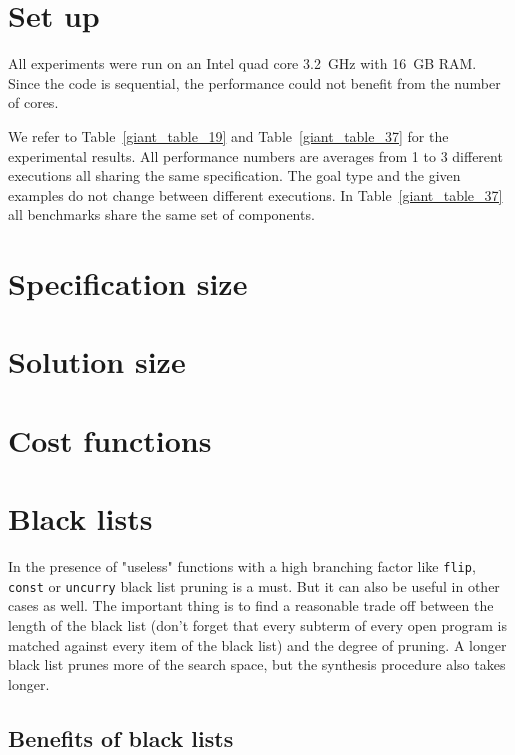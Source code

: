 \section{Set up}
All experiments were run on an Intel quad core 3.2~GHz with 16~GB RAM. Since the code is sequential, the performance could not benefit from the number of cores.

We refer to Table~\ref{giant_table_19} and Table~\ref{giant_table_37} for the experimental results. All performance numbers are averages from 1 to 3 different executions all sharing the same specification. The goal type and the given examples do not change between different executions. In Table~\ref{giant_table_37} all benchmarks share the same set of components.

\section{Specification size}

\section{Solution size}
  
\section{Cost functions}

\section{Black lists}

In the presence of "useless" functions with a high branching factor like \lstinline?flip?, \lstinline?const? or \lstinline?uncurry? black list pruning is a must. But it can also be useful in other cases as well. The important thing is to find a reasonable trade off between the length of the black list (don't forget that every subterm of every open program is matched against every item of the black list) and the degree of pruning. A longer black list prunes more of the search space, but the synthesis procedure also takes longer.

  \subsection{Benefits of black lists}
